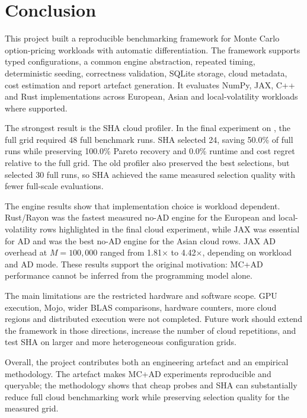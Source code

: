 \chapter{Conclusion}
\label{chap:conclusion}

This project built a reproducible benchmarking framework for Monte Carlo option-pricing workloads with automatic differentiation. The framework supports typed configurations, a common engine abstraction, repeated timing, deterministic seeding, correctness validation, SQLite storage, cloud metadata, cost estimation and report artefact generation. It evaluates NumPy, JAX, C++ and Rust implementations across European, Asian and local-volatility workloads where supported.

The strongest result is the SHA cloud profiler. In the final  experiment on , the full grid required 48 full benchmark runs. SHA selected 24, saving 50.0\% of full runs while preserving 100.0\% Pareto recovery and 0.0\% runtime and cost regret relative to the full grid. The old profiler also preserved the best selections, but selected 30 full runs, so SHA achieved the same measured selection quality with fewer full-scale evaluations.

The engine results show that implementation choice is workload dependent. Rust/Rayon was the fastest measured no-AD engine for the European and local-volatility rows highlighted in the final cloud experiment, while JAX was essential for AD and was the best no-AD engine for the Asian cloud rows. JAX AD overhead at \(M=100{,}000\) ranged from 1.81\(\times\) to 4.42\(\times\), depending on workload and AD mode. These results support the original motivation: MC+AD performance cannot be inferred from the programming model alone.

The main limitations are the restricted hardware and software scope. GPU execution, Mojo, wider BLAS comparisons, hardware counters, more cloud regions and distributed execution were not completed. Future work should extend the framework in those directions, increase the number of cloud repetitions, and test SHA on larger and more heterogeneous configuration grids.

Overall, the project contributes both an engineering artefact and an empirical methodology. The artefact makes MC+AD experiments reproducible and queryable; the methodology shows that cheap probes and SHA can substantially reduce full cloud benchmarking work while preserving selection quality for the measured grid.
